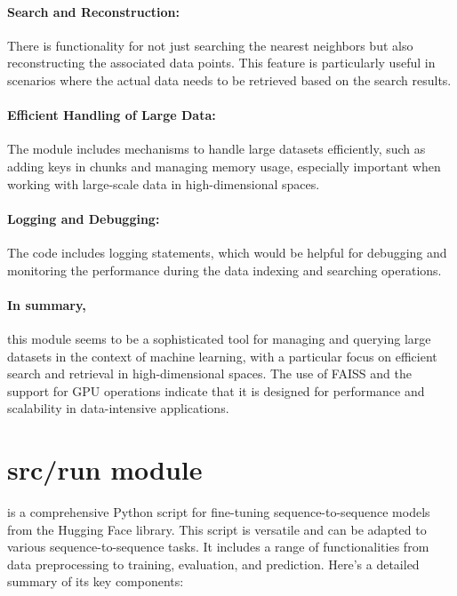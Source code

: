 \documentclass[12pt]{article}
\begin{document}
\paragraph{Search and Reconstruction:} There is functionality for not just
searching the nearest neighbors but also reconstructing the associated data
points. This feature is particularly useful in scenarios where the actual data
needs to be retrieved based on the search results.

\paragraph{Efficient Handling of Large Data:} The module includes mechanisms to
handle large datasets efficiently, such as adding keys in chunks and managing
memory usage, especially important when working with large-scale data in
high-dimensional spaces.

\paragraph{Logging and Debugging:} The code includes logging statements, which
would be helpful for debugging and monitoring the performance during the data
indexing and searching operations.

\paragraph{In summary,} this module seems to be a sophisticated tool for
managing and querying large datasets in the context of machine learning, with a
particular focus on efficient search and retrieval in high-dimensional spaces.
The use of FAISS and the support for GPU operations indicate that it is
designed for performance and scalability in data-intensive applications.


\section*{src/run module} is a comprehensive Python script for fine-tuning
sequence-to-sequence models from the Hugging Face library. This script is
versatile and can be adapted to various sequence-to-sequence tasks. It includes
a range of functionalities from data preprocessing to training, evaluation, and
prediction. Here's a detailed summary of its key components:
\end{document}

